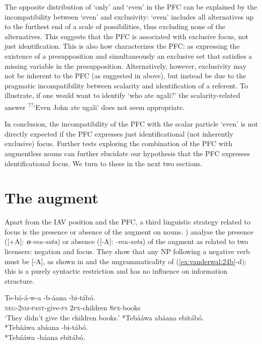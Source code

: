 \documentclass[output=paper]{langsci/langscibook}
\begin{document}
The opposite distribution of ‘only’ and ‘even’ in the PFC can be explained by the incompatibility between ‘even’ and exclusivity: ‘even’ includes all alternatives up to the furthest end of a scale of possibilities, thus excluding none of the alternatives. This suggests that the PFC is associated with exclusive focus, not just identification. This is also how \citet[52]{Walusimbi1996} characterizes the PFC: as expressing the existence of a presupposition and simultaneously an exclusive set that satisfies a missing variable in the presupposition. Alternatively, however, exclusivity may not be inherent to the PFC (as suggested in  above), but instead be due to the pragmatic incompatibility between scalarity and identification of a referent. To illustrate, if one would want to identify ‘who ate ugali?’ the scalarity-related answer \textsuperscript{??}‘Even John ate ugali’ does not seem appropriate.

  In conclusion, the incompatibility of the PFC with the scalar particle ‘even’ is not directly expected if the PFC expresses just identificational (not inherently exclusive) focus. Further tests exploring the combination of the PFC with augmentless nouns can further elucidate our hypothesis that the PFC expresses identificational focus. We turn to these in the next two sections.

\section{The augment}\label{sec:vanderwal:4}

Apart from the IAV position and the PFC, a third linguistic strategy related to focus is the presence or absence of the augment on nouns. \citet{HymanKatamba1990,HymanKatamba1993}) analyse the presence ([+A]: \textbf{\textit{o}}\textit{-mu-sota}) or absence ([-A]: \textit{{\longrule}-mu-sota}) of the augment as related to two licensers: negation and focus. They show that any NP following a negative verb must be [-A], as shown in  and the ungrammaticality of (\ref{ex:vanderwal:24b}-d); this is a purely syntactic restriction and has no influence on information structure.

\ea\label{ex:vanderwal:24}
\ea\label{ex:vanderwal:24a}
\gll    Te-bá-á-w-a      {\longrule}-b-áana    {\longrule}-bi-tábó.\\
       \textsc{neg}-\textsc{2sm}-\textsc{past}-give-\textsc{fs}       \textsc{2px}-children       \textsc{8px}-books\\
\glt   ‘They didn't give the children books.’
\ex \label{ex:vanderwal:24b}   *Tebááwa abáana ebitábó.\\
\ex \label{ex:vanderwal:24c}   *Tebááwa abáana {\longrule}-bi-tábó.\\
\ex \label{ex:vanderwal:24d}   *Tebááwa {\longrule}-báana ebitábó. \\
\glt \citep[224]{HymanKatamba1993}
\z
\z
\end{document}
